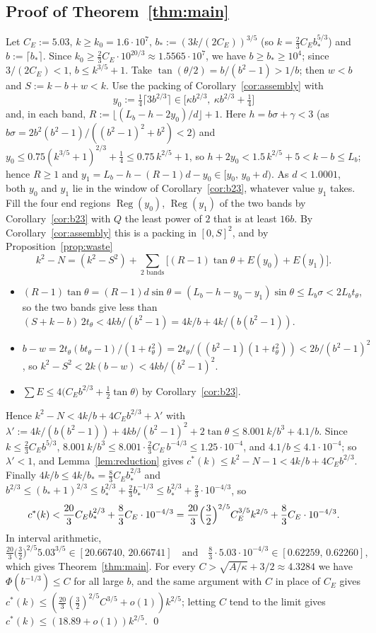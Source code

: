 \documentclass[11pt]{amsart}
\newcommand{\Reg}{\operatorname{Reg}}
\newcommand{\cs}{c^{*}}
\theoremstyle{definition}
\theoremstyle{remark}
\numberwithin{equation}{section}
\begin{document}
\subsection{Proof of Theorem~\ref{thm:main}}\label{ssec:proofmain}
Let $C_E:=5.03$, $k\ge k_0=1.6\cdot10^7$, $b_*:=(3k/(2C_E))^{3/5}$ (so $k=\frac23C_Eb_*^{5/3}$) and $b:=\lceil b_*\rceil$.
Since $k_0\ge\frac23C_E\cdot10^{20/3}\approx1.5565\cdot10^7$, we have $b\ge b_*\ge10^4$; since $3/(2C_E)<1$,
$b\le k^{3/5}+1$. Take $\tan(\theta/2)=b/(b^2-1)>1/b$; then $w<b$ and $S:=k-b+w<k$. Use the packing of
Corollary~\ref{cor:assembly} with
\[
y_0:=\tfrac14\bigl\lceil3b^{2/3}\bigr\rceil\in\bigl[\kappa b^{2/3},\ \kappa b^{2/3}+\tfrac14\bigr]
\]
and, in each band, $R:=\lfloor(L_b-h-2y_0)/d\rfloor+1$. Here $h=b\sigma+\gamma<3$ (as $b\sigma=2b^2(b^2-1)/((b^2-1)^2+b^2)<2$) and
$y_0\le0.75(k^{3/5}+1)^{2/3}+\frac14\le0.75\,k^{2/5}+1$, so $h+2y_0<1.5\,k^{2/5}+5<k-b\le L_b$; hence $R\ge1$ and
$y_1=L_b-h-(R-1)d-y_0\in[y_0,\,y_0+d)$. As $d<1.0001$, both $y_0$ and $y_1$ lie in the window of
Corollary~\ref{cor:b23}, whatever value $y_1$ takes. Fill the four end regions $\Reg(y_0)$, $\Reg(y_1)$ of the two bands
by Corollary~\ref{cor:b23} with $Q$ the least power of $2$ that is at least $16b$. By Corollary~\ref{cor:assembly} this is
a packing in $[0,S]^2$, and by Proposition~\ref{prop:waste}
\[
k^2-N=(k^2-S^2)+\sum_{\text{2 bands}}\bigl[(R-1)\tan\theta+E(y_0)+E(y_1)\bigr].
\]
\begin{itemize}
\item $(R-1)\tan\theta=(R-1)d\sin\theta=(L_b-h-y_0-y_1)\sin\theta\le L_b\sigma<2L_bt_\theta$, so the two bands give less
than $(S+k-b)\,2t_\theta<4kb/(b^2-1)=4k/b+4k/(b(b^2-1))$.
\item $b-w=2t_\theta(bt_\theta-1)/(1+t_\theta^2)=2t_\theta/((b^2-1)(1+t_\theta^2))<2b/(b^2-1)^2$, so
$k^2-S^2<2k(b-w)<4kb/(b^2-1)^2$.
\item $\sum E\le4\bigl(C_Eb^{2/3}+\frac12\tan\theta\bigr)$ by Corollary~\ref{cor:b23}.
\end{itemize}
Hence $k^2-N<4k/b+4C_Eb^{2/3}+\lambda'$ with $\lambda':=4k/(b(b^2-1))+4kb/(b^2-1)^2+2\tan\theta\le8.001\,k/b^3+4.1/b$.
Since $k\le\frac23C_Eb^{5/3}$, $8.001\,k/b^3\le8.001\cdot\frac23C_E\,b^{-4/3}\le1.25\cdot10^{-4}$, and
$4.1/b\le4.1\cdot10^{-4}$; so $\lambda'<1$, and Lemma~\ref{lem:reduction} gives
$\cs(k)\le k^2-N-1<4k/b+4C_Eb^{2/3}$. Finally $4k/b\le4k/b_*=\frac83C_Eb_*^{2/3}$ and
$b^{2/3}\le(b_*+1)^{2/3}\le b_*^{2/3}+\frac23b_*^{-1/3}\le b_*^{2/3}+\frac23\cdot10^{-4/3}$, so
\[
\cs(k)<\frac{20}3C_Eb_*^{2/3}+\frac83C_E\cdot10^{-4/3}=\frac{20}3\Bigl(\frac32\Bigr)^{2/5}C_E^{3/5}k^{2/5}
+\frac83C_E\cdot10^{-4/3}.
\]
In interval arithmetic,
\[
\tfrac{20}3\bigl(\tfrac32\bigr)^{2/5}5.03^{3/5}\in[20.66740,\,20.66741]\quad\text{and}\quad
\tfrac83\cdot5.03\cdot10^{-4/3}\in[0.62259,\,0.62260],
\]
which gives Theorem~\ref{thm:main}. For every $C>\sqrt{A/\kappa}+3/2\approx4.3284$ we
have $\Phi(b^{-1/3})\le C$ for all large $b$, and the same argument with $C$ in place of $C_E$ gives
$\cs(k)\le(\frac{20}3(\frac32)^{2/5}C^{3/5}+o(1))k^{2/5}$; letting $C$ tend to the limit gives
$\cs(k)\le(18.89+o(1))k^{2/5}$. \qed
\end{document}

